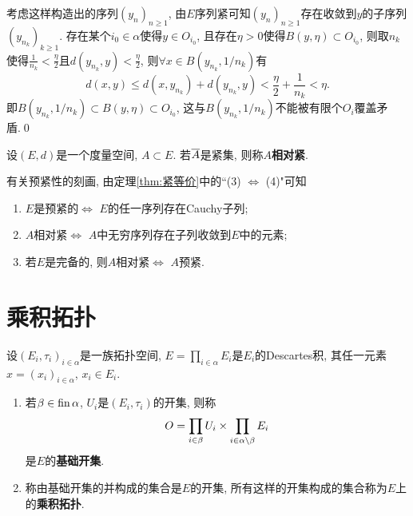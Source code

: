 \begin{Proof}
		考虑这样构造出的序列$ (y_n)_{n\geqslant 1} $, 由$ E $序列紧可知$ (y_n)_{n\geqslant 1} $存在收敛到$ y $的子序列$ (y_{n_k})_{k\geqslant 1} $. 存在某个$ i_0\in\alpha $使得$ y\in O_{i_0} $, 且存在$ \eta>0 $使得$ B(y,\eta)\subset O_{i_0} $, 则取$ n_k $使得$ \frac{1}{n_k}<\frac{\eta}{2} $且$ d(y_{n_k},y)<\frac{\eta}{2} $, 则$ \forall x\in B(y_{n_k},1/n_k) $有
		\[
		d(x,y)\leqslant d(x,y_{n_k})+d(y_{n_k},y)<\frac{\eta}{2}+\frac{1}{n_k}<\eta.
		\]
		即$ B(y_{n_k},1/n_k)\subset B(y,\eta)\subset O_{i_0} $, 这与$ B(y_{n_k},1/n_k) $不能被有限个$ O_i $覆盖矛盾.\qed
	\end{Proof}

	\begin{Definition}[相对紧]\label{def:相对紧}
		设$ (E,d) $是一个度量空间, $ A\subset E $. 若$ \baro{A} $是紧集, 则称$ A $\textbf{相对紧}.
	\end{Definition}

	\begin{Remark}\label{rmk:预紧性的刻画}
		有关预紧性的刻画, 由定理\ref{thm:紧等价}中的``(3) $ \Leftrightarrow $ (4)"可知
		\begin{enumerate}[(1)]
			\item $ E $是预紧的$ \Longleftrightarrow $ $ E $的任一序列存在Cauchy子列;

			\item $ A $相对紧$ \Longleftrightarrow $ $ A $中无穷序列存在子列收敛到$ E $中的元素;

			\item 若$ E $是完备的, 则$ A $相对紧$ \Longleftrightarrow $ $ A $预紧.
		\end{enumerate}
	\end{Remark}

\section{乘积拓扑}

	\begin{Definition}[乘积拓扑]\label{def:乘积拓扑}
		设$ (E_i,\tau_i)_{i\in\alpha} $是一族拓扑空间, $ E=\prod\limits_{i\in\alpha}E_i $是$ E_i $的Descartes积, 其任一元素$ x=(x_i)_{i\in\alpha} $, $ x_i\in E_i $.
		\begin{enumerate}[(1)]
			\item 若$ \beta\in\fin\alpha $, $ U_i $是$ (E_i,\tau_i) $的开集, 则称
			\[
				O=\prod_{i\in\beta}U_i\times\prod_{i\in\alpha\sm\beta}E_i
			\]
			是$ E $的\textbf{基础开集}.

			\item\label{item:乘积拓扑任意并} 称由基础开集的并构成的集合是$ E $的开集, 所有这样的开集构成的集合称为$ E $上的\textbf{乘积拓扑}.
		\end{enumerate}
	\end{Definition}

